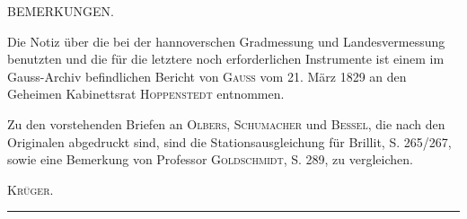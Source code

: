 {\small
\begin{center}BEMERKUNGEN.\end{center}
\par\noindent\hspace*{\parindent}Die Notiz über die bei der hannoverschen Gradmessung und Landesvermessung benutzten und die für die letztere noch erforderlichen Instrumente ist einem im Gauss-Archiv befindlichen Bericht von \textsc{Gauss} vom 21. März 1829 an den Geheimen Kabinettsrat \textsc{Hoppenstedt} entnommen.
\par\noindent\hspace*{\parindent}Zu den vorstehenden Briefen an \textsc{Olbers}, \textsc{Schumacher} und \textsc{Bessel}, die nach den Originalen abgedruckt sind, sind die Stationsausgleichung für Brillit, S. 265/267, sowie eine Bemerkung von Professor \textsc{Goldschmidt}, S. 289, zu vergleichen.
\par\noindent\hfill\textsc{Krüger.}\hspace*{1em}\par}
\vspace{1cm}
\begin{center}\rule{3.5cm}{.4pt}\end{center}
\par\medskip\noindent\makebox[.86\linewidth][r]{63\textsuperscript{*}}\par

